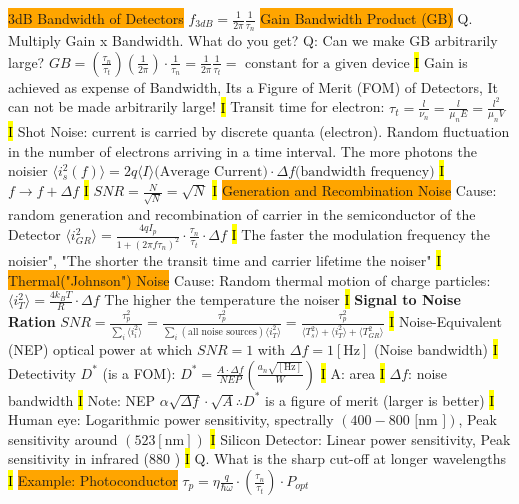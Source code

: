 \documentclass[fontsize=3]{scrartcl}
\begin{document}
\colorbox{Orange}{3dB Bandwidth of Detectors} 
$f_{3dB} = \frac{1}{2\pi}\frac{1}{\tau_n}$
\colorbox{Orange}{Gain Bandwidth Product (GB)}
Q. Multiply Gain x Bandwidth. What do you get? Q: Can we make GB arbitrarily large?
$GB = (\frac{\tau_n}{\tau_t}) (\frac{1}{2\pi}) \cdot \frac{1}{\tau_n} = \frac{1}{2\pi} \frac{1}{\tau_t} = \text{ constant for a given device}$
\hl{I}
Gain is achieved as expense of Bandwidth, Its a Figure of Merit (FOM) of Detectors, It can not be made arbitrarily large! 
\hl{I}
Transit time for electron: $\tau_t = \frac{l}{\nu_n} = \frac{l}{\mu_n E} = \frac{l^2}{\mu_n V}$
\hl{I}
Shot Noise: current is carried by discrete quanta (electron). Random fluctuation in the number of electrons arriving in a time interval. The more photons the noisier
$\langle i_s^2 (f)\rangle = 2q \langle I \rangle \text{(Average Current)} \cdot \Delta f \text{(bandwidth frequency)}$
\hl{I}
$f \rightarrow f + \Delta f$
\hl{I}
$SNR = \frac{N}{\sqrt{N}} = \sqrt{N}$
\hl{I}
\colorbox{Orange}{Generation and Recombination Noise}
Cause: random generation and recombination of carrier in the semiconductor of the Detector $\langle i_{GR}^2 \rangle = \frac{4 q I_p}{1+(2 \pi f \tau_{n})^2} \cdot \frac{\tau_n}{\tau_t} \cdot \Delta f$
\hl{I}
The faster the modulation frequency the noisier", "The shorter the transit time and carrier lifetime the noiser"
\hl{I}
\colorbox{Orange}{Thermal("Johnson") Noise}
Cause: Random thermal motion of charge particles: $\langle i_T^2 \rangle = \frac{4k_B T}{R} \cdot \Delta f$
The higher the temperature the noiser
\hl{I}
\textbf{Signal to Noise Ration} 
$SNR = \frac{\tau_p^2}{\sum_i \langle i_i^2 \rangle} = \frac{\tau_p^2}{\sum_i (\text{all noise sources}) \langle i_T^2 \rangle } = \frac{\tau_p^2}{ \langle T_s^2 \rangle + \langle i_T^2 \rangle + \langle T_{GR}^2 \rangle }$
\hl{I}
Noise-Equivalent (NEP) optical power at which $SNR = 1$ with $\Delta f = 1 [\text{Hz}]$ (Noise bandwidth)
\hl{I}
Detectivity $D^*$ (is a FOM): $D^* = \frac{A \cdot {\Delta f}}{NEP} (\frac{a_n \sqrt{[\text{Hz}]}}{W})$
\hl{I}
A: area 
\hl{I}
$\Delta f$: noise bandwidth
\hl{I}
Note: NEP $\alpha \sqrt{\Delta f} \cdot \sqrt{A} \therefore D^* $ is a figure of merit (larger is better)  
\hl{I}
Human eye: Logarithmic power sensitivity, spectrally $(400 - 800 \text{ [nm ]} )$, Peak sensitivity around $( 523  [\text{nm} ]  )$
\hl{I}
Silicon Detector: Linear power sensitivity, Peak sensitivity in infrared (880 \text{[nm]})
\hl{I}
Q. What is the sharp cut-off at longer wavelengths
\hl{I}
\colorbox{Orange}{Example: Photoconductor} $\tau_p = \eta \frac{q}{\hbar \omega} \cdot (\frac{\tau_n}{\tau_t}) \cdot P_{opt}$
\end{document}
